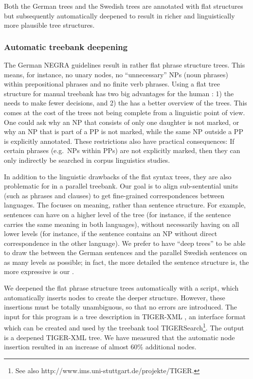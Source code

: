\documentclass[output=paper]{LSP/langsci}
\begin{document}
Both the German trees and the Swedish trees are annotated with flat structures but subsequently automatically deepened to result in richer and linguistically more plausible tree structures. 

\subsubsection{Automatic treebank deepening}\label{sec:volk:2.1.1}

The German NEGRA  guidelines \citep{BrantsEtAl1997} result in rather flat phrase structure trees. This means, for instance, no unary nodes, no ``unnecessary'' NPs (noun phrases) within prepositional phrases and no finite verb phrases. Using a flat tree structure for manual treebank  has two big advantages for the human : 1) the  needs to make fewer decisions, and 2) the  has a better overview of the trees. This comes at the cost of the trees not being complete from a linguistic point of view. One could ask why an NP that consists of only one daughter is not marked, or why an NP that is part of a PP is not marked, while the same NP outside a PP is explicitly annotated. These restrictions also have practical consequences: If certain phrases (e.g.~NPs within PPs) are not explicitly marked, then they can only indirectly be searched in corpus linguistics studies. 

In addition to the linguistic drawbacks of the flat syntax trees, they are also problematic for  in a parallel treebank. Our goal is to align sub-sentential units (such as phrases and clauses) to get fine-grained correspondences between languages. The  focuses on meaning, rather than sentence structure. For example, sentences can have  on a higher level of the tree (for instance, if the sentence carries the same meaning in both languages), without necessarily having  on all lower levels (for instance, if the sentence contains an NP without direct correspondence in the other language). We prefer to have ``deep trees'' to be able to draw the  between the German sentences and the parallel Swedish sentences on as many levels as possible; in fact, the more detailed the sentence structure is, the more expressive is our . 

We deepened the flat phrase structure trees automatically with a script, which automatically inserts nodes to create the deeper structure. However, these insertions must be totally unambiguous, so that no errors are introduced. The input for this program is a tree description in TIGER-XML \citep{König2002}, an interface format which can be created and used by the treebank tool TIGERSearch\footnote{See also http://www.ims.uni-stuttgart.de/projekte/TIGER.}. The output is a deepened TIGER-XML tree. We have measured that the automatic node insertion resulted in an increase of almost 60\% additional nodes. 
\end{document}

